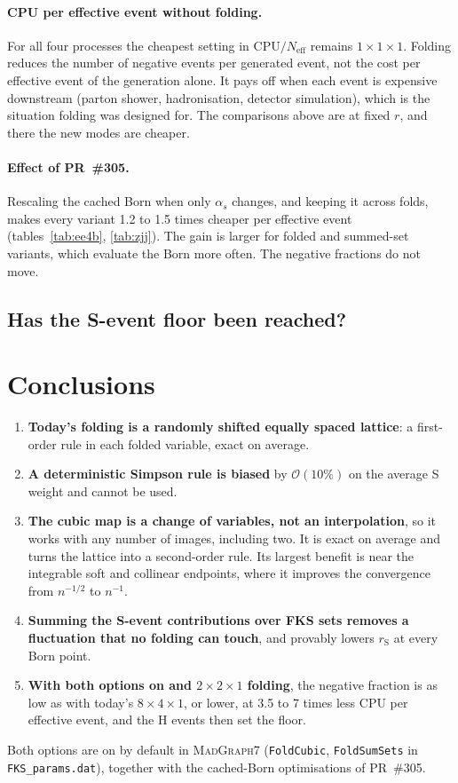 \documentclass[11pt,a4paper]{article}
\newcommand{\mg}{\textsc{MadGraph7}}
\newcommand{\rS}{r_{\mathrm S}}
\newcommand{\Neff}{N_{\mathrm{eff}}}
\newcommand{\code}[1]{\texttt{#1}}
\begin{document}
\paragraph{CPU per effective event without folding.}
For all four processes the cheapest setting in CPU$/\Neff$ remains $1\times1\times1$. Folding
reduces the number of negative events per generated event, not the cost per effective
event of the generation alone. It pays off when each event is expensive downstream (parton
shower, hadronisation, detector simulation), which is the situation folding was designed
for. The comparisons above are at fixed $r$, and there the new modes are cheaper.

\paragraph{Effect of PR~\#305.}
Rescaling the cached Born when only $\alpha_s$ changes, and keeping it across folds,
makes every variant 1.2 to 1.5 times cheaper per effective event
(tables~\ref{tab:ee4b}, \ref{tab:zjj}). The gain is larger for folded and summed-set
variants, which evaluate the Born more often. The negative fractions do not move.

\subsection{Has the S-event floor been reached?}
\label{sec:floor}


\section{Conclusions}
\label{sec:concl}
\begin{enumerate}
\item \textbf{Today's folding is a randomly shifted equally spaced lattice}: a first-order
rule in each folded variable, exact on average.
\item \textbf{A deterministic Simpson rule is biased} by $\mathcal O(10\%)$ on the average S
weight and cannot be used.
\item \textbf{The cubic map is a change of variables, not an interpolation}, so it works with
any number of images, including two. It is exact on average and turns the lattice into a
second-order rule. Its largest benefit is near the integrable soft and collinear endpoints,
where it improves the convergence from $n^{-1/2}$ to $n^{-1}$.
\item \textbf{Summing the S-event contributions over FKS sets removes a fluctuation that no
folding can touch}, and provably lowers $\rS$ at every Born point.
\item \textbf{With both options on and $2\times2\times1$ folding}, the negative fraction is as low as with today's
$8\times4\times1$, or lower, at 3.5 to 7 times less CPU per effective event, and the H events
then set the floor.
\end{enumerate}
Both options are on by default in \mg{} (\code{FoldCubic}, \code{FoldSumSets} in
\code{FKS\_params.dat}), together with the cached-Born optimisations of PR~\#305.
\end{document}
